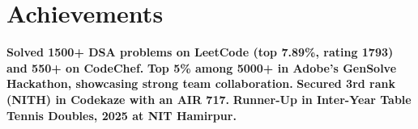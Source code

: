 \documentclass[letterpaper,11pt]{article}
\newcommand{\resumeItemListEnd}{\end{itemize}\vspace{-5pt}}
\begin{document}
\section{\textbf{Achievements}}
\begin{itemize}[leftmargin=0.15in, label={}]
    \setlength{\itemsep}{-0.1pt} %
    \textbf{Solved 1500+ DSA problems on LeetCode (top 7.89\%, rating 1793) and 550+ on CodeChef.}
    \textbf{Top {5\%} among 5000+ in Adobe’s {GenSolve Hackathon}, showcasing strong team collaboration.}
    \textbf{Secured 3rd rank (NITH) in Codekaze with an AIR 717.}
    \textbf{{Runner-Up} in Inter-Year Table Tennis Doubles, 2025 at {NIT Hamirpur}.}
\resumeItemListEnd
\end{document}
